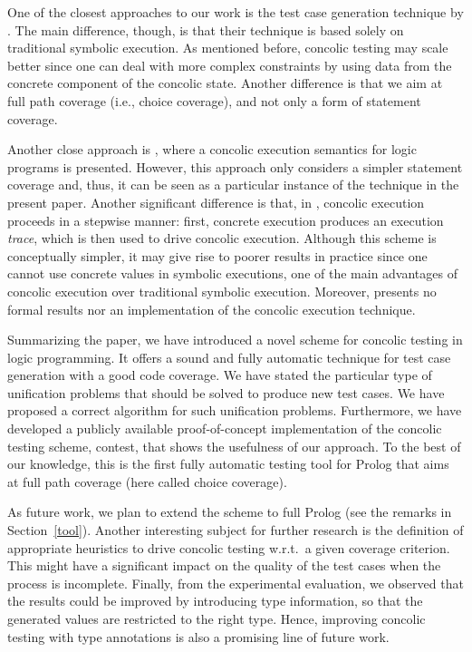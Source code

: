 \documentclass[fleqn]{tlp}
\begin{document}
One of the closest approaches to our work is the test case generation
technique by \cite{AAGR14}. The main difference, though, is that their
technique is based solely on traditional symbolic execution. As
mentioned before, concolic testing may scale better since one can deal
with more complex constraints by using data from the concrete
component of the concolic state.  
Another difference is that we aim at full path coverage (i.e., choice
coverage), and not only a form of statement coverage.

Another close approach is \cite{Vid15}, where a concolic execution
semantics for logic programs is presented. However, this approach only
considers a simpler statement coverage and, thus, it can be seen as a
particular instance of the technique in the present paper. Another
significant difference is that, in \cite{Vid15}, concolic execution
proceeds in a stepwise manner: first, concrete execution produces an
execution \emph{trace}, which is then used to drive concolic
execution. Although this scheme is conceptually simpler, it may give
rise to poorer results in practice since one cannot use concrete
values in symbolic executions, one of the main advantages of concolic
execution over traditional symbolic execution.  Moreover,
 presents no formal results nor an implementation of the
concolic execution technique.

Summarizing the paper, we have introduced a novel scheme for concolic testing in logic
programming. It offers a sound and fully automatic technique for
test case generation with a good code coverage. 
We have stated 
the particular type of unification problems that should be solved to produce new test cases. 
We have proposed a correct algorithm for such unification problems.
Furthermore, we have developed a publicly available
proof-of-concept implementation of the concolic testing scheme,
\textsf{contest}, that shows the usefulness of our approach.
To the best of our knowledge, this is the first fully automatic
testing tool for Prolog that aims at full path coverage (here called choice coverage).

As future work, we plan to extend the scheme to full Prolog (see the
remarks in Section~\ref{tool}).
Another interesting subject for further research is the definition of
appropriate heuristics to drive concolic testing w.r.t.\ a given
coverage criterion. This might have a significant impact on the
quality of the test cases when the process is incomplete.
Finally, from the experimental evaluation, we observed that the
results could be improved by introducing type information, so that the
generated values are restricted to the right type. Hence, improving concolic
testing with type annotations is also a promising line of future work.
\end{document}
